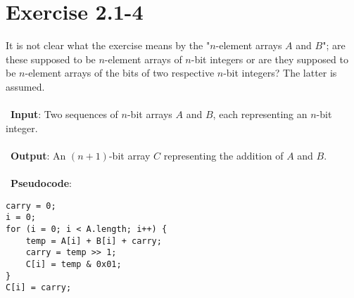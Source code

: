 \documentclass{article}
\begin{document}
\section*{Exercise 2.1-4}

It is not clear what the exercise means by the "$n$-element arrays $A$ and $B$"; are these supposed to be $n$-element arrays of $n$-bit integers or are they supposed to be $n$-element arrays of the bits of two respective $n$-bit integers? The latter is assumed.
\\ \\
\noindent~\textbf{Input}: Two sequences of $n$-bit arrays $A$ and $B$, each representing an $n$-bit integer.
\\ \\
\noindent~\textbf{Output}: An $(n + 1)$-bit array $C$ representing the addition of $A$ and $B$.
\\ \\
\noindent~\textbf{Pseudocode}:
\begin{verbatim}
carry = 0;
i = 0;
for (i = 0; i < A.length; i++) {
    temp = A[i] + B[i] + carry;
    carry = temp >> 1;
    C[i] = temp & 0x01;
}
C[i] = carry;
\end{verbatim}
\end{document}
